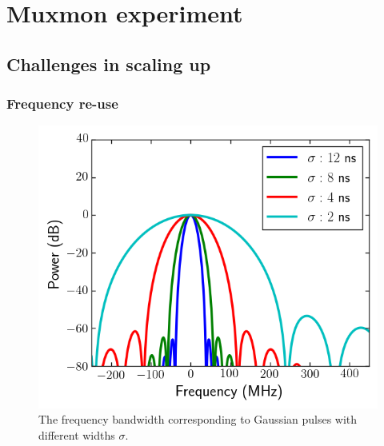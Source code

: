 

\part{Muxmon experiment}

  \chapter{Challenges in scaling up}
    \label{ch:Challenges in scaling up}

    \section{Frequency re-use}
      \label{sec:frequency re-use}

      \begin{figure}
        \begin{center}
        \vspace{-30pt}
          \includegraphics[width=\textwidth]{Figures/Exploring frequency re-use/bandwidth_broadening.png}
        \end{center}
        \caption{The frequency bandwidth corresponding to Gaussian pulses with different widths $\sigma$.}
        \label{fig:bandwidth broadening}
        \vspace{-20pt}
      \end{figure}

